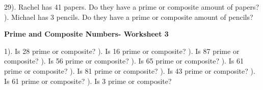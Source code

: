 \documentclass{article}%
\begin{document}
29). Rachel has 41 papers. Do they have a prime or composite amount of papers?%
\newline%
\newline%
). Michael has 3 pencils. Do they have a prime or composite amount of pencils?%
\newline%
\newline%
\newline%
\pagebreak%
\large%
\begin{center}%
\textbf{Prime and Composite Numbers- Worksheet 3}%
\newline%
\newline%
\newline%
\end{center} \normalsize%
1). Is 28 prime or composite?%
\newline%
\newline%
). Is 16 prime or composite?%
\newline%
\newline%
). Is 87 prime or composite?%
\newline%
\newline%
). Is 56 prime or composite?%
\newline%
\newline%
). Is 65 prime or composite?%
\newline%
\newline%
). Is 61 prime or composite?%
\newline%
\newline%
). Is 81 prime or composite?%
\newline%
\newline%
). Is 43 prime or composite?%
\newline%
\newline%
). Is 61 prime or composite?%
\newline%
\newline%
). Is 3 prime or composite?%
\newline%
\newline%
\newline%
\end{document}
